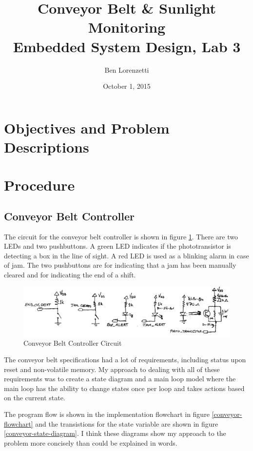 \documentclass[11pt]{article}
\begin{document}
\title{Conveyor Belt \& Sunlight Monitoring\\Embedded System Design, Lab 3}
\date{October 1, 2015}
\author{Ben Lorenzetti}

\maketitle
\tableofcontents
\clearpage

\section{Objectives and Problem Descriptions}

\section{Procedure}

\subsection{Conveyor Belt Controller}

The circuit for the conveyor belt controller is shown in figure \ref{conveyor-circuit}.
There are two LEDs and two pushbuttons.
A green LED indicates if the phototransistor is detecting a box in the line of sight.
A red LED is used as a blinking alarm in case of jam.
The two pushbuttons are for indicating that a jam has been manually cleared
and for indicating the end of a shift.

\begin{figure}[h!]
\centering
\includegraphics[width=.9\textwidth]{conveyor-circuit.pdf}
\caption{Conveyor Belt Controller Circuit}
\label{conveyor-circuit}
\end{figure}

The conveyor belt specifications had a lot of requirements, including
status upon reset and non-volatile memory. My approach to dealing with
all of these requirements was to create a state diagram and a main loop
model where the main loop has the ability to change states once per loop
and takes actions based on the current state.

The program flow is shown in the implementation flowchart in figure
\ref{conveyor-flowchart} and the transistions for the state variable
are shown in figure \ref{conveyor-state-diagram}. I think these diagrams
show my approach to the problem more concisely than could be explained
in words.
\end{document}
